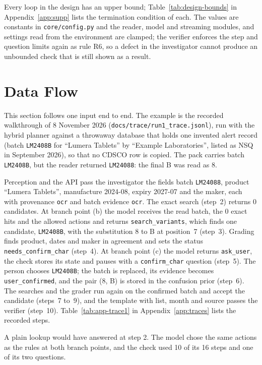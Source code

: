 Every loop in the design has an upper bound; Table~\ref{tab:design-bounds} in
Appendix~\ref{app:supp} lists the termination condition of each. The values are constants in \texttt{core/config.py} and the reader,
model and streaming modules, and settings read from the environment are clamped; the verifier
enforces the step and question limits again as rule R6, so a defect in the investigator cannot
produce an unbounded check that is still shown as a result.

\section{Data Flow}
\label{sec:design-data-flow}

This section follows one input end to end. The example is the recorded walkthrough of 8 November
2026 (\texttt{docs/trace/run1\_trace.jsonl}), run with the hybrid planner against a throwaway
database that holds one invented alert record (batch \texttt{LM2408B} for ``Lumera Tablets'' by
``Example Laboratories'', listed as NSQ in September 2026), so that no CDSCO row is copied. The pack
carries batch \texttt{LM2408B}, but the reader returned \texttt{LM24088}: the final B was read as 8.

Perception and the API pass the investigator the fields batch \texttt{LM24088}, product ``Lumera
Tablets'', manufacture 2024-08, expiry 2027-07 and the maker, each with provenance \texttt{ocr} and
batch evidence \texttt{ocr}. The exact search (step~2) returns 0 candidates. At branch point (b) the
model receives the read batch, the 0 exact hits and the allowed actions and returns
\texttt{search\_variants}, which finds one candidate, \texttt{LM2408B}, with the substitution 8 to B
at position~7 (step~3). Grading finds product, dates and maker in agreement and sets the status
\texttt{needs\_confirm\_char} (step~4). At branch point (c) the model returns \texttt{ask\_user}, the
check stores its state and pauses with a \texttt{confirm\_char} question (step~5). The person chooses
\texttt{LM2408B}; the batch is replaced, its evidence becomes \texttt{user\_confirmed}, and the pair
(8, B) is stored in the confusion prior (step~6). The searches and the grader run again on the
confirmed batch and accept the candidate (steps~7 to~9), and the \FLAGGED{} template with list,
month and source passes the verifier (step~10). Table~\ref{tab:app-trace1} in
Appendix~\ref{app:traces} lists the recorded steps.

A plain lookup would have answered \NLISTED{} at step 2. The model chose the same actions as the
rules at both branch points, and the check used 10 of its 16 steps and one of its two questions.
